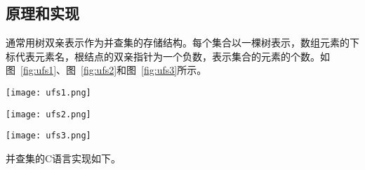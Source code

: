 \subsection{原理和实现}
通常用树双亲表示作为并查集的存储结构。每个集合以一棵树表示，数组元素的下标代表元素名，根结点的双亲指针为一个负数，表示集合的元素的个数。如图~\ref{fig:ufs1}、图~\ref{fig:ufs2}和图~\ref{fig:ufs3}所示。

\begin{center}
\texttt{[image: ufs1.png]}\\
\label{fig:ufs1}
\end{center}

\begin{center}
\texttt{[image: ufs2.png]}\\
\label{fig:ufs2}
\end{center}

\begin{center}
\texttt{[image: ufs3.png]}\\
\label{fig:ufs3}
\end{center}

并查集的C语言实现如下。

